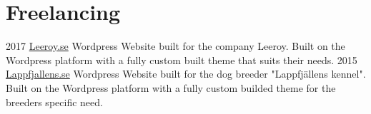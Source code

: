 \section{Freelancing}

\begin{entrylist}
    \entry
        {2017}
        {\href{https://leeroy.se}{Leeroy.se}}
        {Wordpress}
        {Website built for the company Leeroy. Built on the Wordpress platform with a fully custom built theme that suits their needs.}
    \entry
        {2015}
        {\href{http://lappfjallens.se}{Lappfjallens.se}}
        {Wordpress}
        {Website built for the dog breeder "Lappfjällens kennel". Built on the Wordpress platform with a fully custom builded theme for the breeders specific need.}
\end{entrylist}
